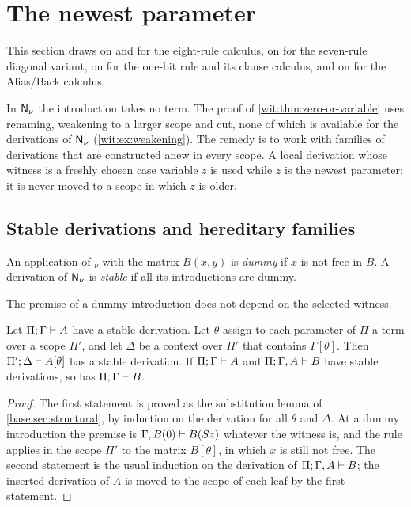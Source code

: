 \section{The newest parameter}
\label{wit:sec:newest}

This section draws on  and  for the
eight-rule calculus, on  for the seven-rule diagonal
variant, on  for the one-bit rule and its clause
calculus, and on  for the Alias/Back calculus.

In $\mathsf{N}_{\nu}$ the introduction takes no term.  The proof of
\cref{wit:thm:zero-or-variable} uses renaming, weakening to a larger scope
and cut, none of which is available for the derivations of $\mathsf{N}_{\nu}$
(\cref{wit:ex:weakening}).  The remedy is to work with families of
derivations that are constructed anew in every scope.  A local derivation
whose witness is a freshly chosen case variable $z$ is used while $z$ is the
newest parameter; it is never moved to a scope in which $z$ is older.

\subsection{Stable derivations and hereditary families}

\begin{definition}
\label{wit:def:stable}
An application of $_\nu$ with the matrix $B(x,y)$ is
\emph{dummy} if $x$ is not free in $B$.  A derivation of $\mathsf{N}_{\nu}$ is
\emph{stable} if all its introductions are dummy.
\end{definition}

The premise of a dummy introduction does not depend on the selected witness.

\begin{lemma}[Stability]
\label{wit:lem:stable}
Let $\Pi;\Gamma\vdash A$ have a stable derivation.  Let $\theta$ assign to
each parameter of $\Pi$ a term over a scope $\Pi'$, and let $\Delta$ be a
context over $\Pi'$ that contains $\Gamma[\theta]$.  Then
$\Pi';\Delta\vdash A[\theta]$ has a stable derivation.  If
$\Pi;\Gamma\vdash A$ and $\Pi;\Gamma,A\vdash B$ have stable derivations,
so has $\Pi;\Gamma\vdash B$.
\end{lemma}

\begin{proof}
The first statement is proved as the substitution lemma of
\cref{base:sec:structural}, by induction on the derivation for all $\theta$
and $\Delta$.  At a dummy introduction the premise is
$\Gamma,B(0)\vdash B(S z)$ whatever the witness is, and the rule applies
in the scope $\Pi'$ to the matrix $B[\theta]$, in which $x$ is still not
free.  The second statement is the usual induction on the derivation of
$\Pi;\Gamma,A\vdash B$; the inserted derivation of $A$ is moved to the
scope of each leaf by the first statement.
\end{proof}

